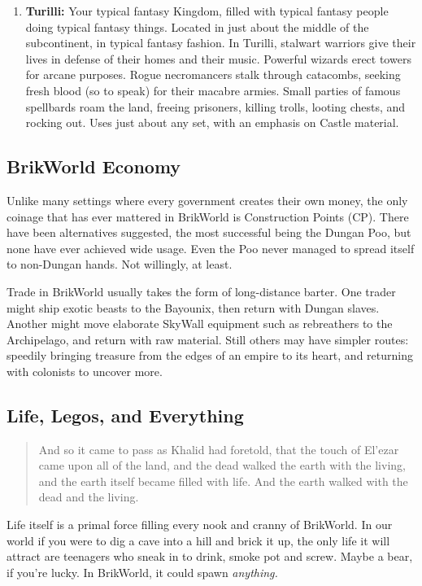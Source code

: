 \documentclass[12pt,a4paper,twocolumn]{article}
\begin{document}
\begin{enumerate}
\item {\bf Turilli:} Your typical fantasy Kingdom, filled with typical fantasy people doing typical fantasy things.  Located in just about the middle of the subcontinent, in typical fantasy fashion.  In Turilli, stalwart warriors give their lives in defense of their homes and their music.  Powerful wizards erect towers for arcane purposes.  Rogue necromancers stalk through catacombs, seeking fresh blood (so to speak) for their macabre armies.  Small parties of famous spellbards roam the land, freeing prisoners, killing trolls, looting chests, and rocking out.  Uses just about any set, with an emphasis on Castle material.

\end{enumerate}

\subsection{BrikWorld Economy}

Unlike many settings where every government creates their own money, the only coinage that has ever mattered in BrikWorld is Construction Points (CP).  There have been alternatives suggested, the most successful being the Dungan Poo, but none have ever achieved wide usage.  Even the Poo never managed to spread itself to non-Dungan hands.  Not willingly, at least.

Trade in BrikWorld usually takes the form of long-distance barter.  One trader might ship exotic beasts to the Bayounix, then return with Dungan slaves.  Another might move elaborate SkyWall equipment such as rebreathers to the Archipelago, and return with raw material.  Still others may have simpler routes: speedily bringing treasure from the edges of an empire to its heart, and returning with colonists to uncover more.

\subsection{Life, Legos, and Everything}
\begin{quote}
And so it came to pass as Khalid had foretold, that the touch of El'ezar came upon all of the land, and the dead walked the earth with the living, and the earth itself became filled with life.  And the earth walked with the dead and the living.
\end{quote}

Life itself is a primal force filling every nook and cranny of BrikWorld.  In our world if you were to dig a cave into a hill and brick it up, the only life it will attract are teenagers who sneak in to drink, smoke pot and screw.  Maybe a bear, if you're lucky.  In BrikWorld, it could spawn {\em anything.}  
\end{document}
